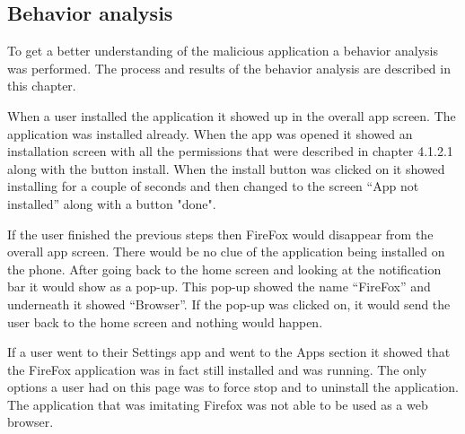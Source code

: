 \subsection{Behavior analysis}
To get a better understanding of the malicious application a behavior analysis was performed.
The process and results of the behavior analysis are described in this chapter.

When a user installed the application it showed up in the overall app screen.
The application was installed already.
When the app was opened it showed an installation screen with all the permissions that were described in chapter 4.1.2.1 along with the button install.
When the install button was clicked on it showed installing for a couple of seconds and then changed to the screen “App not installed” along with a button "done".
 
If the user finished the previous steps then FireFox would disappear from the overall app screen.
There would be no clue of the application being installed on the phone.
After going back to the home screen and looking at the notification bar it would show as a pop-up.
This pop-up showed the name “FireFox” and underneath it showed “Browser”.
If the pop-up was clicked on, it would send the user back to the home screen and nothing would happen.

If a user went to their Settings app and went to the Apps section it showed that the FireFox application was in fact still installed and was running.
The only options a user had on this page was to force stop and to uninstall the application.
The application that was imitating Firefox was not able to be used as a web browser.